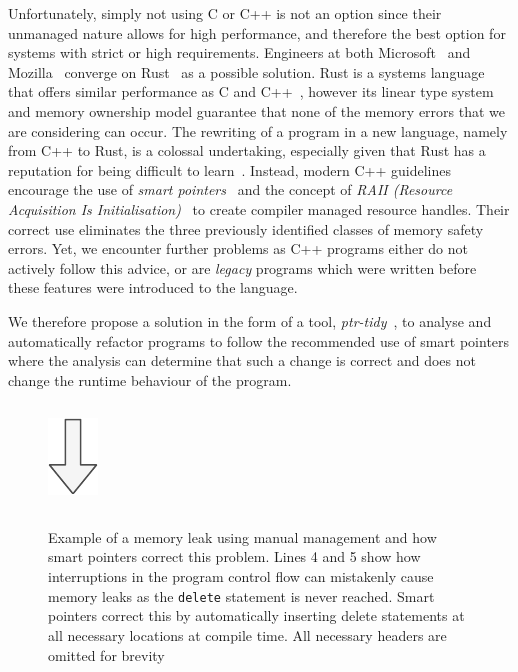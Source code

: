 \documentclass{mpaper}
\begin{document}
    
    Unfortunately, simply not using C or C++ is not an option since their unmanaged nature allows for high performance, and therefore the best option for systems with strict or high requirements.
    Engineers at both Microsoft~\cite{Thomas2019} and Mozilla~\cite{Hostfelt2019} converge on Rust~\cite{Balasubramanian2017} as a possible solution.
    Rust is a systems language that offers similar performance as C and C++~\cite{Lin2016}, however its linear type system and memory ownership model guarantee that none of the memory errors that we are considering can occur.
    The rewriting of a program in a new language, namely from C++ to Rust, is a colossal undertaking, especially given that Rust has a reputation for being difficult to learn~\cite{Astrauskas2019}.
    Instead, modern C++ guidelines encourage the use of \emph{smart pointers}~\cite{Dimov2003} and the concept of \emph{RAII (Resource Acquisition Is Initialisation)}~\cite{Stroustrup2000} to create compiler managed resource handles.
    Their correct use eliminates the three previously identified classes of memory safety errors.
    Yet, we encounter further problems as C++ programs either do not actively follow this advice, or are \emph{legacy} programs which were written before these features were introduced to the language.
    
    We therefore propose a solution in the form of a tool, \emph{ptr-tidy}~\cite{Usov2021}, to analyse and automatically refactor programs to follow the recommended use of smart pointers where the analysis can determine that such a change is correct and does not change the runtime behaviour of the program. 
    
    \begin{figure}
        \centering
        \inputminted{c++}{code/leak.cpp}
        \includegraphics{images/arrow.pdf}
        \inputminted{c++}{code/fix-leak.cpp}
        \caption{Example of a memory leak using manual management and how smart pointers correct this problem. Lines 4 and 5 show how interruptions in the program control flow can mistakenly cause memory leaks as the \texttt{delete} statement is never reached. Smart pointers correct this by automatically inserting delete statements at all necessary locations at compile time. All necessary headers are omitted for brevity}
        \label{lst:motivating-example}
    \end{figure}
    
\end{document}
